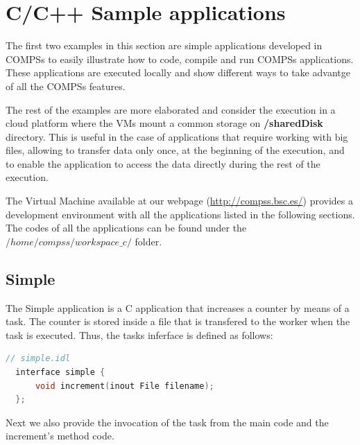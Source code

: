 \section{C/C++ Sample applications}
\label{sec:CSampleApps}

The first two examples in this section are simple applications developed in COMPSs to easily illustrate how to code,
compile and run COMPSs applications. These applications are executed locally and show different ways to take advantge
of all the COMPSs features. 

The rest of the examples are more elaborated and consider the execution in a cloud platform where the VMs mount a common 
storage on \textbf{/sharedDisk} directory. This is useful in the case of applications that require working 
with big files, allowing to transfer data only once, at the beginning of the execution, and to enable 
the application to access the data directly during the rest of the execution.

The Virtual Machine available at our webpage (\url{http://compss.bsc.es/}) provides a development environment with
all the applications listed in the following sections. The codes of all the applications can be found under the 
$/home/compss/workspace\_c/$ folder. 


\subsection{Simple}
The Simple application is a C application that increases a counter by means of a task. The counter is stored inside a file that 
is transfered to the worker when the task is executed. Thus, the tasks inferface is defined as follows:

\begin{lstlisting}[language=c]
  // simple.idl
  interface simple {
	  void increment(inout File filename);
  };
\end{lstlisting}

Next we also provide the invocation of the task from the main code and the increment's method code.

